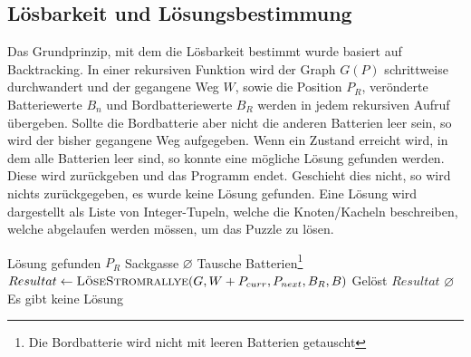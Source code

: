 \documentclass[a4paper,10pt,ngerman]{scrartcl}
\let\oldReturn\Return
\renewcommand{\Return}{\State\oldReturn}
\begin{document}
\subsection{Lösbarkeit und Lösungsbestimmung} \label{solution}
Das Grundprinzip, mit dem die Lösbarkeit bestimmt wurde basiert auf Backtracking. In einer rekursiven Funktion wird der Graph \(G(P)\) schrittweise durchwandert und der gegangene Weg \(W\), sowie die Position \(P_R\), verönderte Batteriewerte \(B_n\) und Bordbatteriewerte \(B_R\) werden in jedem rekursiven Aufruf übergeben. Sollte die Bordbatterie aber nicht die anderen Batterien leer sein, so wird der bisher gegangene Weg aufgegeben.
Wenn ein Zustand erreicht wird, in dem alle Batterien leer sind, so konnte eine mögliche Lösung gefunden werden. Diese wird zurückgeben und das Programm endet. Geschieht dies nicht, so wird nichts zurückgegeben, es wurde keine Lösung gefunden. Eine Lösung wird dargestellt als Liste von Integer-Tupeln, welche die Knoten/Kacheln beschreiben, welche abgelaufen werden mössen, um das Puzzle zu lösen.
\\
\begin{algorithmic}[1]
	\Comment Lösung gefunden
		\Return $P_R$
	 \Comment Sackgasse
		\Return $\varnothing$
	\EndIf
			\State Tausche Batterien\footnote{Die Bordbatterie wird nicht mit leeren Batterien getauscht}
		\EndIf
		\State $Resultat \gets \textsc{LöseStromrallye}(G, W + P_{curr}, P_{next}, B_R,  B)$
		 \Comment Gelöst
			\Return $Resultat$
		\EndIf
	\EndFor
	\Return $\varnothing$ \Comment Es gibt keine Lösung
\EndProcedure
\end{algorithmic}
\end{document}
